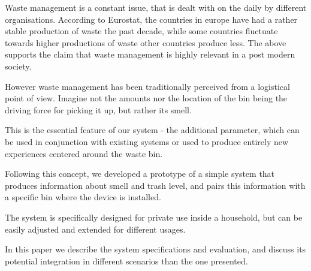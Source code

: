 Waste management is a constant issue, that is dealt with on the daily by different organisations.
According to Eurostat, the countries in europe have had a rather stable production of waste the past decade, while some countries fluctuate towards higher productions of waste other countries produce less. 
The above supports the claim that waste management is highly relevant in a post modern society.

However waste management has been traditionally perceived from a logistical point of view.
Imagine not the amounts nor the location of the bin being the driving force for picking it up, but rather its smell.

This is the essential feature of our system - the additional parameter, which can be used in conjunction with existing systems or used to produce entirely new experiences centered around the waste bin.

Following this concept, we developed a prototype of a simple system that produces information about smell and trash level, and pairs this information with a specific bin where the device is installed. 

The system is specifically designed for private use inside a household, but can be easily adjusted and extended for different usages.

In this paper we describe the system specifications and evaluation, and discuss its potential integration in different scenarios than the one presented.